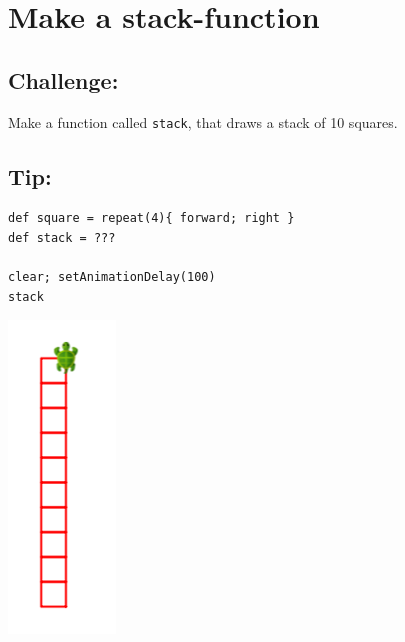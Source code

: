 \chapter{Make a stack-function}
\begin{multicols}{2}
\section*{\color{BrickRed}Challenge:}
Make a function called \lstinline{stack}, that draws a stack of 10 squares.
\section*{\color{OliveGreen}Tip:}

\begin{lstlisting}[numbers=none]
def square = repeat(4){ forward; right }  
def stack = ???

clear; setAnimationDelay(100)
stack
\end{lstlisting}
        

\columnbreak

\begin{center}
\includegraphics{../img/square-column.png}
\end{center}

\end{multicols}

